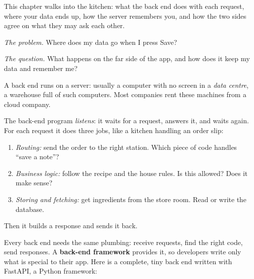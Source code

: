 \label{ch:webapp-03}

\chapterrule

This chapter walks into the kitchen: what the back end does with each request, where your data ends up, how the server remembers you, and how the two sides agree on what they may ask each other.

\emph{The problem.} Where does my data go when I press Save?

\emph{The question.} What happens on the far side of the app, and how does it keep my data and remember me?

\label{webapp-03:a-computer-that-never-sleeps}

A back end runs on a server: usually a computer with no screen in a \emph{data centre}, a warehouse full of such computers. Most companies rent these machines from a cloud company.

The back-end program \emph{listens}: it waits for a request, answers it, and waits again. For each request it does three jobs, like a kitchen handling an order slip:

\begin{enumerate}
\def\labelenumi{\arabic{enumi}.}
\tightlist
\item
  \emph{Routing:} send the order to the right station. Which piece of code handles ``save a note''?
\item
  \emph{Business logic:} follow the recipe and the house rules. Is this allowed? Does it make sense?
\item
  \emph{Storing and fetching:} get ingredients from the store room. Read or write the database.
\end{enumerate}

\noindent{}Then it builds a response and sends it back.

\label{webapp-03:back-end-frameworks}

Every back end needs the same plumbing: receive requests, find the right code, send responses. A \textbf{back-end framework} provides it, so developers write only what is special to their app. Here is a complete, tiny back end written with FastAPI, a Python framework:

